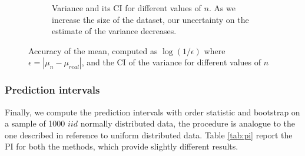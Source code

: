 \documentclass[twoside,onecolumn]{article}
\theoremstyle{definition}
\begin{document}
\begin{figure}
\begin{subfigure}{0.5\textwidth}
         \caption{Variance and its CI for different values of $n$. As we increase the size of the dataset, our uncertainty on the estimate of the variance decreases.}
         \label{fig:N_norm_var}
     \end{subfigure}
  \caption{Accuracy of the mean, computed as $\log(1/\epsilon)$ where $\epsilon=|\mu_n-\mu_{real}|$, and the CI of the variance for different values of $n$}\label{fig:N_norm}
\end{figure}


\subsubsection{Prediction intervals}
Finally, we compute the prediction intervals with order statistic and bootstrap on a sample of 1000 $iid$ normally distributed data, the procedure is analogue to the one described in reference to uniform distributed data. Table \ref{tab:pi} report the PI for both the methods, which provide slightly different results.
\end{document}
